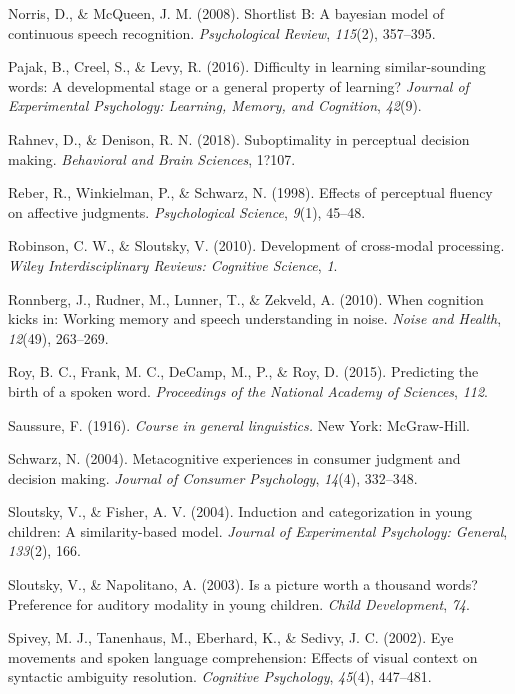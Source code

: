 \documentclass[english,floatsintext,man]{apa6}
\theoremstyle{definition}
\theoremstyle{definition}
\theoremstyle{definition}
\theoremstyle{remark}
\begin{document}
\hypertarget{ref-Norris08}{}
Norris, D., \& McQueen, J. M. (2008). Shortlist B: A bayesian model of
continuous speech recognition. \emph{Psychological Review},
\emph{115}(2), 357--395.

\hypertarget{ref-pajak2016}{}
Pajak, B., Creel, S., \& Levy, R. (2016). Difficulty in learning
similar-sounding words: A developmental stage or a general property of
learning? \emph{Journal of Experimental Psychology: Learning, Memory,
and Cognition}, \emph{42}(9).

\hypertarget{ref-rahnev2018}{}
Rahnev, D., \& Denison, R. N. (2018). Suboptimality in perceptual
decision making. \emph{Behavioral and Brain Sciences}, 1?107.

\hypertarget{ref-reber98}{}
Reber, R., Winkielman, P., \& Schwarz, N. (1998). Effects of perceptual
fluency on affective judgments. \emph{Psychological Science},
\emph{9}(1), 45--48.

\hypertarget{ref-robinson2010}{}
Robinson, C. W., \& Sloutsky, V. (2010). Development of cross-modal
processing. \emph{Wiley Interdisciplinary Reviews: Cognitive Science},
\emph{1}.

\hypertarget{ref-Ronnberg10}{}
Ronnberg, J., Rudner, M., Lunner, T., \& Zekveld, A. (2010). When
cognition kicks in: Working memory and speech understanding in noise.
\emph{Noise and Health}, \emph{12}(49), 263--269.

\hypertarget{ref-roy2015}{}
Roy, B. C., Frank, M. C., DeCamp, M., P., \& Roy, D. (2015). Predicting
the birth of a spoken word. \emph{Proceedings of the National Academy of
Sciences}, \emph{112}.

\hypertarget{ref-saussure1916}{}
Saussure, F. (1916). \emph{Course in general linguistics.} New York:
McGraw-Hill.

\hypertarget{ref-schwarz2004}{}
Schwarz, N. (2004). Metacognitive experiences in consumer judgment and
decision making. \emph{Journal of Consumer Psychology}, \emph{14}(4),
332--348.

\hypertarget{ref-sloutsky2004}{}
Sloutsky, V., \& Fisher, A. V. (2004). Induction and categorization in
young children: A similarity-based model. \emph{Journal of Experimental
Psychology: General}, \emph{133}(2), 166.

\hypertarget{ref-sloutsky2003}{}
Sloutsky, V., \& Napolitano, A. (2003). Is a picture worth a thousand
words? Preference for auditory modality in young children. \emph{Child
Development}, \emph{74}.

\hypertarget{ref-spivey2002}{}
Spivey, M. J., Tanenhaus, M., Eberhard, K., \& Sedivy, J. C. (2002). Eye
movements and spoken language comprehension: Effects of visual context
on syntactic ambiguity resolution. \emph{Cognitive Psychology},
\emph{45}(4), 447--481.
\end{document}
